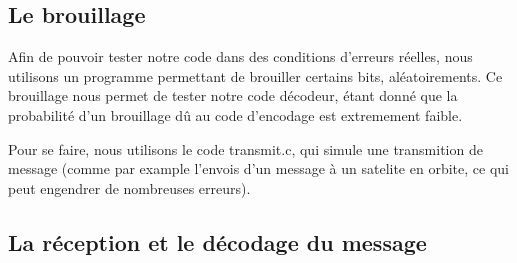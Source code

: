 \documentclass[12pt]{article}
\begin{document}
\subsection{Le brouillage}
\label{sub:brouillage}

Afin de pouvoir tester notre code dans des conditions d'erreurs réelles, nous utilisons un programme permettant de brouiller certains bits, aléatoirements. Ce brouillage nous permet de tester notre code décodeur, étant donné que la probabilité d'un brouillage dû au code d'encodage est extremement faible.

Pour se faire, nous utilisons le code transmit.c, qui simule une transmition de message (comme par example l'envois d'un message à un satelite en orbite, ce qui peut engendrer de nombreuses erreurs).



\subsection{La réception et le décodage du message}
\label{sub:La réception et le décodage du message}
\end{document}
